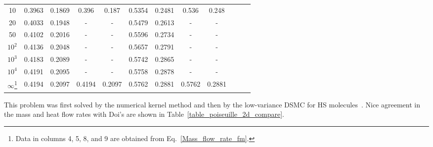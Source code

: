 \begin{table}[t]
\begin{minipage}{14cm}
\begin{tabular}{cccccccccccc}
			10     & 0.3963 & 0.1869   & 0.396   & 0.187  & 0.5354  & 0.2481    & 0.536   & 0.248  \\
			20     & 0.4033 & 0.1948   & -       &-       & 0.5479  & 0.2613    & -       & -  \\
			50     & 0.4102 & 0.2016   & -       &-       & 0.5596  & 0.2734    & -       & -  \\
			$10^2$ & 0.4136 & 0.2048   & -       &-       & 0.5657  & 0.2791    & -       & -  \\
			$10^3$ & 0.4183 & 0.2089   & -       &-       & 0.5742  & 0.2865    & -       & - \\   
			$10^4$ & 0.4191 & 0.2095   & -       &-       & 0.5758  & 0.2878    & -       & - \\   
			$\infty$\footnote{Data in columns 4, 5, 8, and 9 are obtained from Eq.~\eqref{Mass_flow_rate_fm}.} & 0.4194 & 0.2097   & 0.4194  & 0.2097 & 0.5762  & 0.2881    & 0.5762  & 0.2881  \\
			\hline
		\end{tabular}\par
		\vspace{-0.75\skip\footins}
		\renewcommand{\footnoterule}{}
	\end{minipage}
\end{table}


This problem was first solved by the numerical kernel method and then by the low-variance DSMC for HS molecules~\cite{Doi2010,Radtke2011}. Nice agreement in the mass and heat flow rates with Doi's are shown in Table~\ref{table_poiseuille_2d_compare}. 






